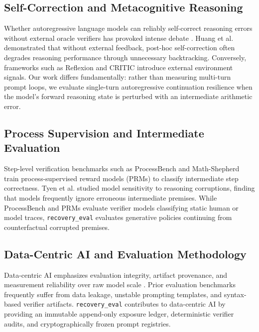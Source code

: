 \documentclass[conference]{IEEEtran}
\begin{document}
\subsection{Self-Correction and Metacognitive Reasoning}
Whether autoregressive language models can reliably self-correct reasoning errors without external oracle verifiers has provoked intense debate \cite{huang2023large, kumar2024training, madaan2023selfrefine}. Huang et al. \cite{huang2023large} demonstrated that without external feedback, post-hoc self-correction often degrades reasoning performance through unnecessary backtracking. Conversely, frameworks such as Reflexion \cite{shinn2023reflexion} and CRITIC \cite{gou2024critic} introduce external environment signals. Our work differs fundamentally: rather than measuring multi-turn prompt loops, we evaluate single-turn autoregressive continuation resilience when the model's forward reasoning state is perturbed with an intermediate arithmetic error.

\subsection{Process Supervision and Intermediate Evaluation}
Step-level verification benchmarks such as ProcessBench \cite{zheng2024processbench} and Math-Shepherd \cite{wang2024mathshepherd} train process-supervised reward models (PRMs) to classify intermediate step correctness. Tyen et al. \cite{tyen2024llms} studied model sensitivity to reasoning corruptions, finding that models frequently ignore erroneous intermediate premises. While ProcessBench and PRMs evaluate verifier models classifying static human or model traces, \texttt{recovery\_eval} evaluates generative policies continuing from counterfactual corrupted premises.

\subsection{Data-Centric AI and Evaluation Methodology}
Data-centric AI emphasizes evaluation integrity, artifact provenance, and measurement reliability over raw model scale \cite{sambasivan2021everyone, ribeiro2020beyond, gardner2020evaluating}. Prior evaluation benchmarks frequently suffer from data leakage, unstable prompting templates, and syntax-based verifier artifacts. \texttt{recovery\_eval} contributes to data-centric AI by providing an immutable append-only exposure ledger, deterministic verifier audits, and cryptographically frozen prompt registries.
\end{document}
